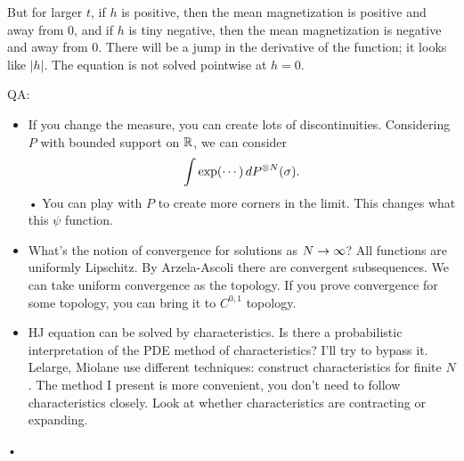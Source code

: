 But for larger $t$, if $h$ is positive, then the mean magnetization is positive and away from 0, and if $h$ is tiny negative, then the mean magnetization is negative and away from 0. There will be a jump in the derivative of the function; it looks like $|h|$. The equation is not solved pointwise at $h=0$.

QA:
\begin{itemize}
\item
If you change the measure, you can create lots of discontinuities.
Considering $P$ with bounded support on $\mathbb{R}$, we can consider
\begin{align*}
\int \exp(\cdots) \,dP^{\otimes N}(\sigma). 
\end{align*}•
You can play with $P$ to create more corners in the limit.
This changes what this $\psi$ function.
\item 
What's the notion of convergence for solutions as $N\to \infty$? All functions are uniformly Lipschitz. By Arzela-Ascoli there are convergent subsequences. We can take uniform convergence as the topology. If you prove convergence for some topology, you can bring it to $C^{0,1}$ topology.
\item 
HJ equation can be solved by characteristics. Is there a probabilistic interpretation of the PDE method of characteristics?
I'll try to bypass it. 
Lelarge, Miolane use different techniques: construct characteristics for finite $N$.
The method I present is more convenient, you don't need to follow characteristics closely. Look at whether characteristics are contracting or expanding. %
\end{itemize}•